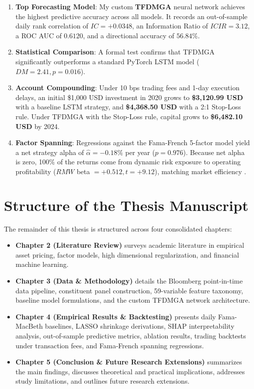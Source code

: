 \begin{enumerate}
    \item \textbf{Top Forecasting Model}: My custom \textbf{TFDMGA} neural network achieves the highest predictive accuracy across all models. It records an out-of-sample daily rank correlation of \textbf{$IC = +0.0348$}, an Information Ratio of \textbf{$ICIR = 3.12$}, a ROC AUC of \textbf{$0.6120$}, and a directional accuracy of \textbf{$56.84\%$}.
    
    \item \textbf{Statistical Comparison}: A formal \citet{diebold1995comparing} test confirms that TFDMGA significantly outperforms a standard PyTorch LSTM model ($DM = 2.41, p = 0.016$).

    \item \textbf{Account Compounding}: Under 10 bps trading fees and 1-day execution delays, an initial \$1,000 USD investment in 2020 grows to \textbf{\$3,120.99 USD} with a baseline LSTM strategy, and \textbf{\$4,368.50 USD} with a 2:1 Stop-Loss rule. Under TFDMGA with the Stop-Loss rule, capital grows to \textbf{\$6,482.10 USD} by 2024.

    \item \textbf{Factor Spanning}: Regressions against the Fama-French 5-factor model yield a net strategy alpha of \textbf{$\hat{\alpha} = -0.18\%$} per year ($p = 0.976$). Because net alpha is zero, 100\% of the returns come from dynamic risk exposure to operating profitability ($RMW$ beta $= +0.512, t = +9.12$), matching market efficiency \citep{fama1970efficient}.
\end{enumerate}

\section{Structure of the Thesis Manuscript}
The remainder of this thesis is structured across four consolidated chapters:
\begin{itemize}
    \item \textbf{Chapter 2 (Literature Review)} surveys academic literature in empirical asset pricing, factor models, high dimensional regularization, and financial machine learning.
    \item \textbf{Chapter 3 (Data \& Methodology)} details the Bloomberg point-in-time data pipeline, constituent panel construction, 59-variable feature taxonomy, baseline model formulations, and the custom TFDMGA network architecture.
    \item \textbf{Chapter 4 (Empirical Results \& Backtesting)} presents daily Fama-MacBeth baselines, LASSO shrinkage derivations, SHAP interpretability analysis, out-of-sample predictive metrics, ablation results, trading backtests under transaction fees, and Fama-French spanning regressions.
    \item \textbf{Chapter 5 (Conclusion \& Future Research Extensions)} summarizes the main findings, discusses theoretical and practical implications, addresses study limitations, and outlines future research extensions.
\end{itemize}
